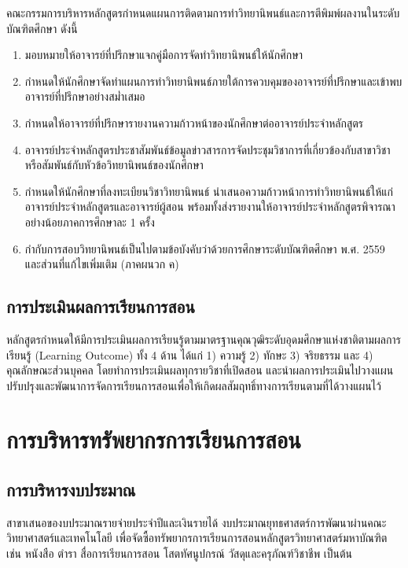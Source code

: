  คณะกรรมการบริหารหลักสูตรกำหนดแผนการติดตามการทำวิทยานิพนธ์และการตีพิมพ์ผลงานในระดับบัณฑิตศึกษา ดังนี้ 

 \begin{enumerate}
   	\item มอบหมายให้อาจารย์ที่ปรึกษาแจกคู่มือการจัดทำวิทยานิพนธ์ให้นักศึกษา   
   	\item กำหนดให้นักศึกษาจัดทำแผนการทำวิทยานิพนธ์ภายใต้การควบคุมของอาจารย์ที่ปรึกษาและเข้าพบอาจารย์ที่ปรึกษาอย่างสม่ำเสมอ
   	\item กำหนดให้อาจารย์ที่ปรึกษารายงานความก้าวหน้าของนักศึกษาต่ออาจารย์ประจำหลักสูตร  	  
   	\item อาจารย์ประจำหลักสูตรประชาสัมพันธ์ข้อมูลข่าวสารการจัดประชุมวิชาการที่เกี่ยวข้องกับสาขาวิชาหรือสัมพันธ์กับหัวข้อวิทยานิพนธ์ของนักศึกษา
   	\item กำหนดให้นักศึกษาที่ลงทะเบียนวิชาวิทยานิพนธ์ นำเสนอความก้าวหน้าการทำวิทยานิพนธ์ให้แก่อาจารย์ประจำหลักสูตรและอาจารย์ผู้สอน พร้อมทั้งส่งรายงานให้อาจารย์ประจำหลักสูตรพิจารณาอย่างน้อยภาคการศึกษาละ 1 ครั้ง  	
   	\item  กำกับการสอบวิทยานิพนธ์เป็นไปตามข้อบังคับ\university ว่าด้วยการศึกษาระดับบัณฑิตศึกษา พ.ศ. 2559 และส่วนที่แก้ไขเพิ่มเติม (ภาคผนวก ค)   	
   	 \end{enumerate}


\subsection{การประเมินผลการเรียนการสอน}
หลักสูตรกำหนดให้มีการประเมินผลการเรียนรู้ตามมาตรฐานคุณวุฒิระดับอุดมศึกษาแห่งชาติตามผลการเรียนรู้ (Learning Outcome) ทั้ง 4 ด้าน ได้แก่ 1) ความรู้ 2) ทักษะ 3) จริยธรรม และ 4) คุณลักษณะส่วนบุคคล โดยทำการประเมินผลทุกรายวิชาที่เปิดสอน และนำผลการประเมินไปวางแผนปรับปรุงและพัฒนาการจัดการเรียนการสอนเพื่อให้เกิดผลสัมฤทธิ์ทางการเรียนตามที่ได้วางแผนไว้

\section{การบริหารทรัพยากรการเรียนการสอน}
\subsection{การบริหารงบประมาณ}
สาขา\thdegreebranch เสนอของบประมาณรายจ่ายประจำปีและเงินรายได้ งบประมาณยุทธศาสตร์การพัฒนา\university ผ่านคณะวิทยาศาสตร์และเทคโนโลยี เพื่อจัดซื้อทรัพยากรการเรียนการสอนหลักสูตรวิทยาศาสตร์มหาบัณฑิต เช่น หนังสือ ตำรา สื่อการเรียนการสอน โสตทัศนูปกรณ์ วัสดุและครุภัณฑ์วิชาชีพ เป็นต้น

